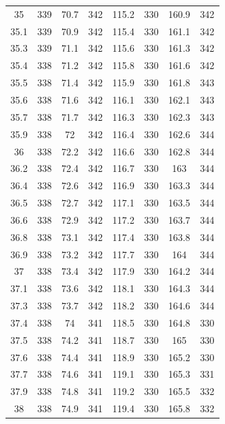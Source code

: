 \documentclass[12pt]{ctexart}
\numberwithin{equation}{section}
\begin{document}
\begin{longtable}{cc|cc|cc|cc}
35  &  339  &  70.7  &  342  &  115.2  &  330  &  160.9  &  342  \\
35.1  &  339  &  70.9  &  342  &  115.4  &  330  &  161.1  &  342  \\
35.3  &  339  &  71.1  &  342  &  115.6  &  330  &  161.3  &  342  \\
35.4  &  338  &  71.2  &  342  &  115.8  &  330  &  161.6  &  342  \\
35.5  &  338  &  71.4  &  342  &  115.9  &  330  &  161.8  &  343  \\
35.6  &  338  &  71.6  &  342  &  116.1  &  330  &  162.1  &  343  \\
35.7  &  338  &  71.7  &  342  &  116.3  &  330  &  162.3  &  343  \\
35.9  &  338  &  72  &  342  &  116.4  &  330  &  162.6  &  344  \\
36  &  338  &  72.2  &  342  &  116.6  &  330  &  162.8  &  344  \\
36.2  &  338  &  72.4  &  342  &  116.7  &  330  &  163  &  344  \\
36.4  &  338  &  72.6  &  342  &  116.9  &  330  &  163.3  &  344  \\
36.5  &  338  &  72.7  &  342  &  117.1  &  330  &  163.5  &  344  \\
36.6  &  338  &  72.9  &  342  &  117.2  &  330  &  163.7  &  344  \\
36.8  &  338  &  73.1  &  342  &  117.4  &  330  &  163.8  &  344  \\
36.9  &  338  &  73.2  &  342  &  117.7  &  330  &  164  &  344  \\
37  &  338  &  73.4  &  342  &  117.9  &  330  &  164.2  &  344  \\
37.1  &  338  &  73.6  &  342  &  118.1  &  330  &  164.3  &  344  \\
37.3  &  338  &  73.7  &  342  &  118.2  &  330  &  164.6  &  344  \\
37.4  &  338  &  74  &  341  &  118.5  &  330  &  164.8  &  330  \\
37.5  &  338  &  74.2  &  341  &  118.7  &  330  &  165  &  330  \\
37.6  &  338  &  74.4  &  341  &  118.9  &  330  &  165.2  &  330  \\
37.7  &  338  &  74.6  &  341  &  119.1  &  330  &  165.3  &  331  \\
37.9  &  338  &  74.8  &  341  &  119.2  &  330  &  165.5  &  332  \\
38  &  338  &  74.9  &  341  &  119.4  &  330  &  165.8  &  332  \\

\end{longtable}
\end{document}
